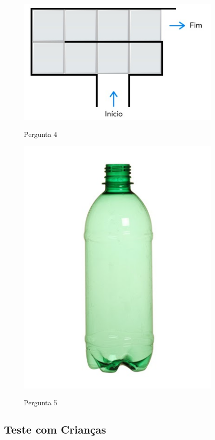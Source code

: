 \begin{figure}[H]
    \caption{Pergunta 4}
    \centering
    \includegraphics[width=10cm]{Imagens/Cap5/Q4.png}
    \label{figura:q4}
\end{figure}


\begin{figure}[H]
    \caption{Pergunta 5}
    \centering
    \includegraphics[width=10cm]{Imagens/Cap5/Q5.png}
    \label{figura:q5}
\end{figure}

\subsection{\textbf{Teste com Crianças}}


